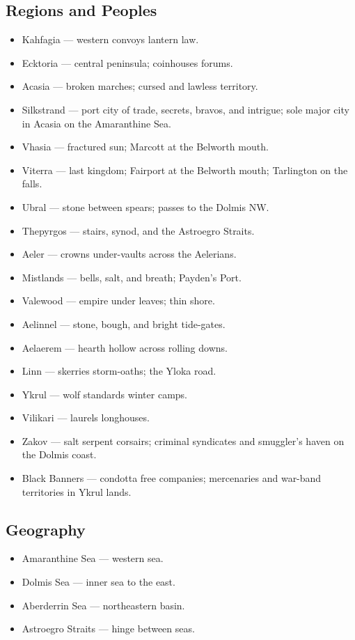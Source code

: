 \subsection{Regions and Peoples}
\begin{itemize}
\item Kahfagia --- western convoys lantern law.
\item Ecktoria --- central peninsula; coinhouses forums.
\item Acasia --- broken marches; cursed and lawless territory.
\item Silkstrand --- port city of trade, secrets, bravos, and intrigue; sole major city in Acasia on the Amaranthine Sea.
\item Vhasia --- fractured sun; Marcott at the Belworth mouth.
\item Viterra --- last kingdom; Fairport at the Belworth mouth; Tarlington on the falls.
\item Ubral --- stone between spears; passes to the Dolmis NW.
\item Thepyrgos --- stairs, synod, and the Astroegro Straits.
\item Aeler --- crowns under-vaults across the Aelerians.
\item Mistlands --- bells, salt, and breath; Payden's Port.
\item Valewood --- empire under leaves; thin shore.
\item Aelinnel --- stone, bough, and bright tide-gates.
\item Aelaerem --- hearth hollow across rolling downs.
\item Linn --- skerries storm-oaths; the Yloka road.
\item Ykrul --- wolf standards winter camps.
\item Vilikari --- laurels longhouses.
\item Zakov --- salt serpent corsairs; criminal syndicates and smuggler's haven on the Dolmis coast.
\item Black Banners --- condotta free companies; mercenaries and war-band territories in Ykrul lands.
\end{itemize}

\subsection{Geography}
\begin{itemize}
\item Amaranthine Sea --- western sea.
\item Dolmis Sea --- inner sea to the east.
\item Aberderrin Sea --- northeastern basin.
\item Astroegro Straits --- hinge between seas.
\end{itemize}

